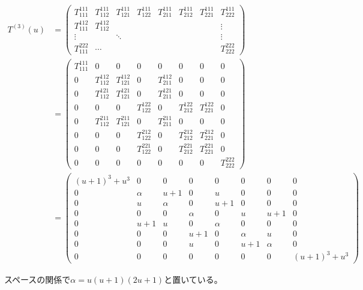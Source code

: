 \documentclass[12pt,a4paper]{ltjsarticle}
\begin{document}
\begin{enumerate}
      \begin{align}
       T^{(3)}(u) &=
        \begin{pmatrix}
         T^{111}_{111} & T^{111}_{112} & T^{111}_{121} & T^{111}_{122} & T^{111}_{211} & T^{111}_{212} & T^{111}_{221} & T^{111}_{222}\\
         T^{112}_{111} & T^{112}_{112} &  &  &  &  &  & \vdots\\
         \vdots & & \ddots & & & & & \vdots \\
         T^{222}_{111} & \cdots &  &  & & & & T^{222}_{222}
        \end{pmatrix}\\
       &=
        \begin{pmatrix}
         T^{111}_{111} & 0 & 0 & 0 & 0 & 0 & 0 & 0\\
         0 & T^{112}_{112} & T^{112}_{121} & 0 & T^{112}_{211} & 0 & 0 & 0 \\
         0 & T^{121}_{112} & T^{121}_{121} & 0 & T^{121}_{211} & 0 & 0 & 0 \\
         0 & 0 & 0 & T^{122}_{122} & 0 & T^{122}_{212} & T^{122}_{221} & 0 \\
         0 & T^{211}_{112} & T^{211}_{121} & 0 & T^{211}_{211} & 0 & 0 & 0 \\
         0 & 0 & 0 & T^{212}_{122} & 0 & T^{212}_{212} & T^{212}_{221} & 0 \\
         0 & 0 & 0 & T^{221}_{122} & 0 & T^{221}_{212} & T^{221}_{221} & 0 \\
         0 & 0 & 0 & 0 & 0 & 0 & 0 & T^{222}_{222}
        \end{pmatrix}\\
       &=
        \begin{pmatrix}
         (u+1)^{3}+u^{3} & 0 & 0 & 0 & 0 & 0 & 0 & 0\\
         0 & \alpha & u+1 & 0 & u & 0 & 0 & 0 \\
         0 & u & \alpha & 0 & u+1 & 0 & 0 & 0 \\
         0 & 0 & 0 & \alpha & 0 & u & u+1 & 0 \\
         0 & u+1 & u & 0 & \alpha & 0 & 0 & 0 \\
         0 & 0 & 0 & u+1 & 0 & \alpha & u & 0 \\
         0 & 0 & 0 & u & 0 & u+1 & \alpha & 0 \\
         0 & 0 & 0 & 0 & 0 & 0 & 0 &  (u+1)^{3}+u^{3}
        \end{pmatrix}
      \end{align}

      スペースの関係で$\alpha = u(u+1)(2u+1)$と置いている。



      \hrulefill

\end{enumerate}

\hrulefill
\end{document}
